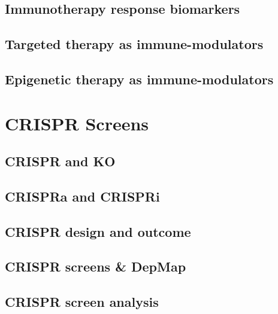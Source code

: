 \documentclass[]{book}
\begin{document}
\hypertarget{immunotherapy-response-biomarkers}{%
\section{Immunotherapy response biomarkers}\label{immunotherapy-response-biomarkers}}

\hypertarget{targeted-therapy-as-immune-modulators}{%
\section{Targeted therapy as immune-modulators}\label{targeted-therapy-as-immune-modulators}}

\hypertarget{epigenetic-therapy-as-immune-modulators}{%
\section{Epigenetic therapy as immune-modulators}\label{epigenetic-therapy-as-immune-modulators}}

\hypertarget{crispr}{%
\chapter{CRISPR Screens}\label{crispr}}

\hypertarget{crispr-and-ko}{%
\section{CRISPR and KO}\label{crispr-and-ko}}

\hypertarget{crispra-and-crispri}{%
\section{CRISPRa and CRISPRi}\label{crispra-and-crispri}}

\hypertarget{crispr-design-and-outcome}{%
\section{CRISPR design and outcome}\label{crispr-design-and-outcome}}

\hypertarget{crispr-screens-depmap}{%
\section{CRISPR screens \& DepMap}\label{crispr-screens-depmap}}

\hypertarget{crispr-screen-analysis}{%
\section{CRISPR screen analysis}\label{crispr-screen-analysis}}
\end{document}
